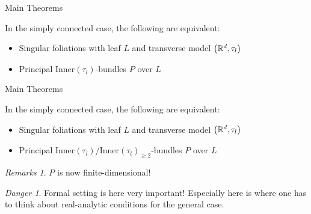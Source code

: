 \documentclass[
aspectratio=3218, 
10pt
]{beamer}
\theoremstyle{plain}
\theoremstyle{remark}
\newtheorem*{remark}{Remarks}
\newtheorem*{danger}{Danger}
\begin{document}
{\begin{frame}{Main Theorems}
\begin{theorem}[{[C.\ L.-G., S.-R.\ F.]}]\vspace{.5pt}
In the simply connected case, the following are equivalent:
\begin{itemize}
	\item Singular foliations with leaf $L$ and transverse model $\mleft(\mathbb{R}^d, \tau_l\mright)$
	\item Principal $\mathrm{Inner}(\tau_l)$-bundles $P$ over $L$
\end{itemize}
\end{theorem}

\begin{center}
\end{center}

\end{frame}

\begin{frame}{Main Theorems}
\begin{theorem}[{[C.\ L.-G., S.-R.\ F.]}]\vspace{.5pt}
In the simply connected case, the following are equivalent:
\begin{itemize}
	\item Singular foliations with leaf $L$ and transverse model $\mleft(\mathbb{R}^d, \tau_l\mright)$
	\item Principal $\mathrm{Inner}(\tau_l)/\mathrm{Inner}(\tau_l)_{\geq 2}$-bundles $P$ over $L$
\end{itemize}
\end{theorem}

\pause

\begin{remark}
$P$ is now finite-dimensional!
\end{remark}
\pause
\begin{danger}
Formal setting is here very important! Especially here is where one has to think about real-analytic conditions for the general case.
\end{danger}

\end{frame}
}
\end{document}
